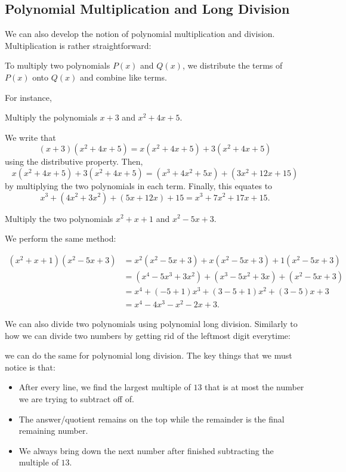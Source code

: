 \documentclass[11pt]{scrartcl}
\begin{document}
\subsection{Polynomial Multiplication and Long Division}

We can also develop the notion of polynomial multiplication and division. Multiplication is rather straightforward:

\begin{definition*}
To multiply two polynomials $P(x)$ and $Q(x)$, we distribute the terms of $P(x)$ onto $Q(x)$ and combine like terms.
\end{definition*}

For instance,

\begin{example*}
Multiply the polynomials $x+3$ and $x^2+4x+5$.
\end{example*}

We write that \[(x+3)(x^2+4x+5) = x(x^2+4x+5)+3(x^2+4x+5)\] using the distributive property. Then, \[x(x^2+4x+5)+3(x^2+4x+5) = (x^3+4x^2+5x)+(3x^2+12x+15)\] by multiplying the two polynomials in each term. Finally, this equates to \[x^3+(4x^2+3x^2)+(5x+12x)+15 = x^3+7x^2+17x+15.\]

\begin{example*}
Multiply the two polynomials $x^2+x+1$ and $x^2-5x+3$.
\end{example*}

We perform the same method:

\begin{align*}
(x^2+x+1)(x^2-5x+3) &= x^2(x^2-5x+3)+x(x^2-5x+3)+1(x^2-5x+3) \\
&= (x^4-5x^3+3x^2)+(x^3-5x^2+3x)+(x^2-5x+3) \\
&= x^4+(-5+1)x^3+(3-5+1)x^2+(3-5)x+3 \\
&= x^4-4x^3-x^2-2x+3.
\end{align*}

We can also divide two polynomials using polynomial long division. Similarly to how we can divide two numbers by getting rid of the leftmost digit everytime:

\begin{center}
\end{center}

we can do the same for polynomial long division. The key things that we must notice is that:

\begin{itemize}
\item After every line, we find the largest multiple of $13$ that is at most the number we are trying to subtract off of.
\item The answer/quotient remains on the top while the remainder is the final remaining number.
\item We always bring down the next number after finished subtracting the multiple of $13$.
\end{itemize}
\end{document}
